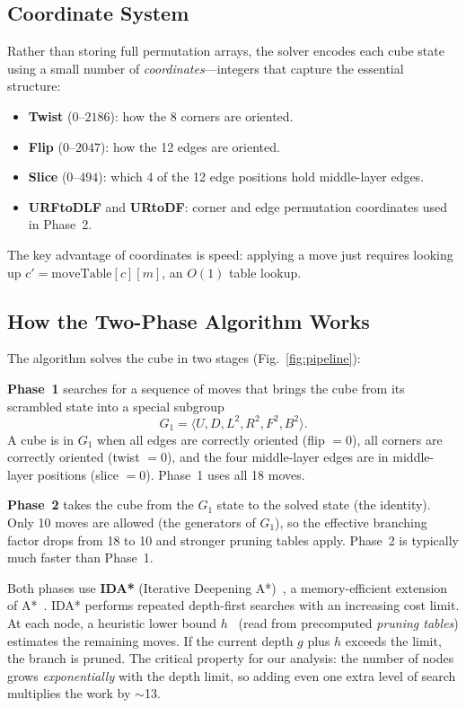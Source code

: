 \documentclass[graybox]{svmult}
\begin{document}
\subsection{Coordinate System}
\label{sec:coordinates}

Rather than storing full permutation arrays, the solver encodes each cube state using a small number of \emph{coordinates}---integers that capture the essential structure:

\begin{itemize}[leftmargin=*]
  \item \textbf{Twist} ($0$--$2186$): how the 8 corners are oriented.
  \item \textbf{Flip} ($0$--$2047$): how the 12 edges are oriented.
  \item \textbf{Slice} ($0$--$494$): which 4 of the 12 edge positions hold middle-layer edges.
  \item \textbf{URFtoDLF} and \textbf{URtoDF}: corner and edge permutation coordinates used in Phase~2.
\end{itemize}

The key advantage of coordinates is speed: applying a move just requires looking up $c' = \text{moveTable}[c][m]$, an $O(1)$ table lookup.

\subsection{How the Two-Phase Algorithm Works}
\label{sec:two-phase}

The algorithm solves the cube in two stages (Fig.~\ref{fig:pipeline}):

\textbf{Phase~1} searches for a sequence of moves that brings the cube from its scrambled state into a special subgroup
\begin{equation}
G_1 = \langle U, D, L^2, R^2, F^2, B^2 \rangle.
\end{equation}
A cube is in $G_1$ when all edges are correctly oriented (flip $= 0$), all corners are correctly oriented (twist $= 0$), and the four middle-layer edges are in middle-layer positions (slice $= 0$). Phase~1 uses all 18 moves.

\textbf{Phase~2} takes the cube from the $G_1$ state to the solved state (the identity). Only 10 moves are allowed (the generators of $G_1$), so the effective branching factor drops from 18 to 10 and stronger pruning tables apply. Phase~2 is typically much faster than Phase~1.

Both phases use \textbf{IDA*} (Iterative Deepening A*)~\cite{korf1985}, a memory-efficient extension of A*~\cite{hart1968}. IDA* performs repeated depth-first searches with an increasing cost limit. At each node, a heuristic lower bound $h$~\cite{pearl1984} (read from precomputed \emph{pruning tables}) estimates the remaining moves. If the current depth $g$ plus $h$ exceeds the limit, the branch is pruned. The critical property for our analysis: the number of nodes grows \emph{exponentially} with the depth limit, so adding even one extra level of search multiplies the work by $\sim$13.
\end{document}
